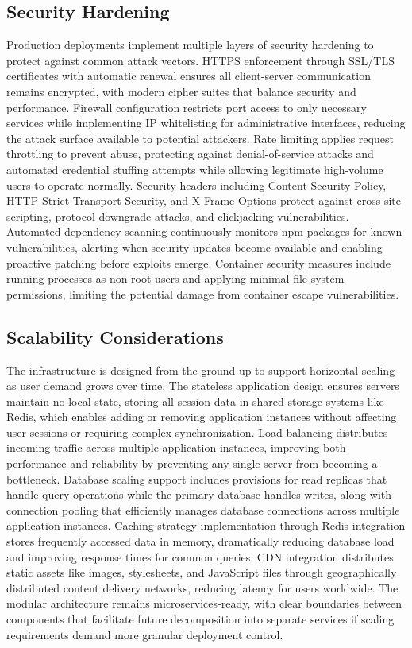 \subsection{Security Hardening}
Production deployments implement multiple layers of security hardening to protect against common attack vectors. HTTPS enforcement through SSL/TLS certificates with automatic renewal ensures all client-server communication remains encrypted, with modern cipher suites that balance security and performance. Firewall configuration restricts port access to only necessary services while implementing IP whitelisting for administrative interfaces, reducing the attack surface available to potential attackers. Rate limiting applies request throttling to prevent abuse, protecting against denial-of-service attacks and automated credential stuffing attempts while allowing legitimate high-volume users to operate normally. Security headers including Content Security Policy, HTTP Strict Transport Security, and X-Frame-Options protect against cross-site scripting, protocol downgrade attacks, and clickjacking vulnerabilities. Automated dependency scanning continuously monitors npm packages for known vulnerabilities, alerting when security updates become available and enabling proactive patching before exploits emerge. Container security measures include running processes as non-root users and applying minimal file system permissions, limiting the potential damage from container escape vulnerabilities.

\subsection{Scalability Considerations}
The infrastructure is designed from the ground up to support horizontal scaling as user demand grows over time. The stateless application design ensures servers maintain no local state, storing all session data in shared storage systems like Redis, which enables adding or removing application instances without affecting user sessions or requiring complex synchronization. Load balancing distributes incoming traffic across multiple application instances, improving both performance and reliability by preventing any single server from becoming a bottleneck. Database scaling support includes provisions for read replicas that handle query operations while the primary database handles writes, along with connection pooling that efficiently manages database connections across multiple application instances. Caching strategy implementation through Redis integration stores frequently accessed data in memory, dramatically reducing database load and improving response times for common queries. CDN integration distributes static assets like images, stylesheets, and JavaScript files through geographically distributed content delivery networks, reducing latency for users worldwide. The modular architecture remains microservices-ready, with clear boundaries between components that facilitate future decomposition into separate services if scaling requirements demand more granular deployment control.

